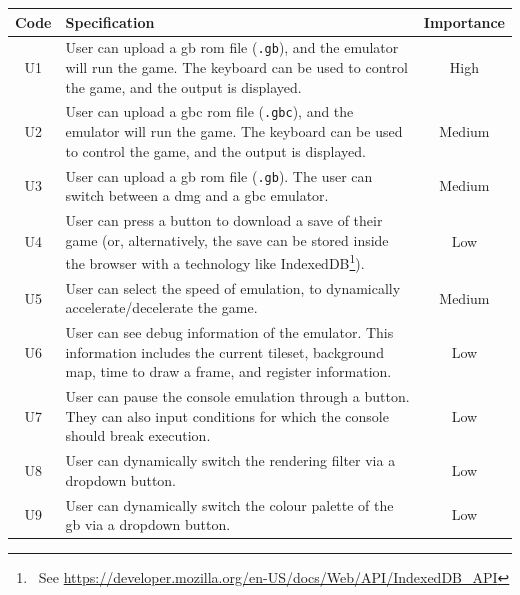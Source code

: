 \documentclass[11pt]{informatics-report}
\newcommand{\ftnt}[1]{\footnote{~See \url{#1}}}
\begin{document}
\begin{xltabular}{\textwidth}{|c|X|c|}
    \hline
    \textbf{Code} & \textbf{Specification} & \textbf{Importance}\\
    \hline\hline
    \endhead

    U1 & User can upload a \gls{gb} \gls{rom} file (\texttt{.gb}), and the emulator will run the game. The keyboard can be used to control the game, and the output is displayed. & High \\ \hline
    U2 & User can upload a \gls{gbc} \gls{rom} file (\texttt{.gbc}), and the emulator will run the game. The keyboard can be used to control the game, and the output is displayed. & Medium \\ \hline
    U3 & User can upload a \gls{gb} \gls{rom} file (\texttt{.gb}). The user can switch between a \gls{dmg} and a \gls{gbc} emulator. & Medium \\ \hline
    U4 & User can press a button to download a save of their game (or, alternatively, the save can be stored inside the browser with a technology like IndexedDB\ftnt{https://developer.mozilla.org/en-US/docs/Web/API/IndexedDB_API}). & Low \\ \hline
    U5 & User can select the speed of emulation, to dynamically accelerate/decelerate the game. & Medium \\ \hline
    U6 & User can see debug information of the emulator. This information includes the current tileset, background map, time to draw a frame, and register information. & Low \\ \hline
    U7 & User can pause the console emulation through a button. They can also input conditions for which the console should break execution. & Low \\ \hline
    U8 & User can dynamically switch the rendering filter via a dropdown button. & Low \\ \hline
    U9 & User can dynamically switch the colour palette of the \gls{gb} via a dropdown button. & Low \\ \hline


\end{xltabular}
\end{document}
